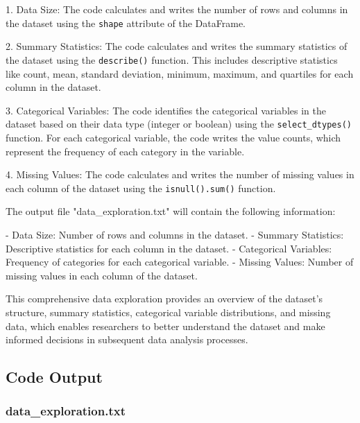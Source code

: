 \documentclass[11pt]{article}
\begin{document}
1. Data Size: The code calculates and writes the number of rows and columns in the dataset using the \texttt{shape} attribute of the DataFrame.

2. Summary Statistics: The code calculates and writes the summary statistics of the dataset using the \texttt{describe()} function. This includes descriptive statistics like count, mean, standard deviation, minimum, maximum, and quartiles for each column in the dataset.

3. Categorical Variables: The code identifies the categorical variables in the dataset based on their data type (integer or boolean) using the \texttt{select\_dtypes()} function. For each categorical variable, the code writes the value counts, which represent the frequency of each category in the variable.

4. Missing Values: The code calculates and writes the number of missing values in each column of the dataset using the \texttt{isnull().sum()} function.

The output file "data\_exploration.txt" will contain the following information:

- Data Size: Number of rows and columns in the dataset.
- Summary Statistics: Descriptive statistics for each column in the dataset.
- Categorical Variables: Frequency of categories for each categorical variable.
- Missing Values: Number of missing values in each column of the dataset.

This comprehensive data exploration provides an overview of the dataset's structure, summary statistics, categorical variable distributions, and missing data, which enables researchers to better understand the dataset and make informed decisions in subsequent data analysis processes.

\subsection{Code Output}

\subsubsection*{data\_exploration.txt}
\end{document}
